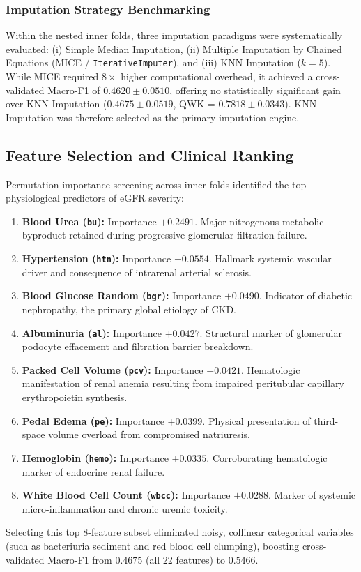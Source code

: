 \documentclass[conference]{IEEEtran}
\begin{document}
\subsubsection{Imputation Strategy Benchmarking}
Within the nested inner folds, three imputation paradigms were systematically evaluated: (i) Simple Median Imputation, (ii) Multiple Imputation by Chained Equations (MICE / \texttt{IterativeImputer}), and (iii) KNN Imputation ($k = 5$). While MICE required $8\times$ higher computational overhead, it achieved a cross-validated Macro-F1 of $0.4620 \pm 0.0510$, offering no statistically significant gain over KNN Imputation ($0.4675 \pm 0.0519$, QWK = $0.7818 \pm 0.0343$). KNN Imputation was therefore selected as the primary imputation engine.

\subsection{Feature Selection and Clinical Ranking}
Permutation importance screening across inner folds identified the top physiological predictors of eGFR severity:
\begin{enumerate}
    \item \textbf{Blood Urea (\texttt{bu}):} Importance $+0.2491$. Major nitrogenous metabolic byproduct retained during progressive glomerular filtration failure.
    \item \textbf{Hypertension (\texttt{htn}):} Importance $+0.0554$. Hallmark systemic vascular driver and consequence of intrarenal arterial sclerosis.
    \item \textbf{Blood Glucose Random (\texttt{bgr}):} Importance $+0.0490$. Indicator of diabetic nephropathy, the primary global etiology of CKD.
    \item \textbf{Albuminuria (\texttt{al}):} Importance $+0.0427$. Structural marker of glomerular podocyte effacement and filtration barrier breakdown.
    \item \textbf{Packed Cell Volume (\texttt{pcv}):} Importance $+0.0421$. Hematologic manifestation of renal anemia resulting from impaired peritubular capillary erythropoietin synthesis.
    \item \textbf{Pedal Edema (\texttt{pe}):} Importance $+0.0399$. Physical presentation of third-space volume overload from compromised natriuresis.
    \item \textbf{Hemoglobin (\texttt{hemo}):} Importance $+0.0335$. Corroborating hematologic marker of endocrine renal failure.
    \item \textbf{White Blood Cell Count (\texttt{wbcc}):} Importance $+0.0288$. Marker of systemic micro-inflammation and chronic uremic toxicity.
\end{enumerate}
Selecting this top 8-feature subset eliminated noisy, collinear categorical variables (such as bacteriuria sediment and red blood cell clumping), boosting cross-validated Macro-F1 from $0.4675$ (all 22 features) to $0.5466$.
\end{document}
